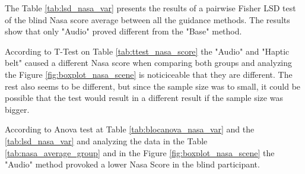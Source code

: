 

The Table \ref{tab:lsd_nasa_var} presents the results of a pairwise Fisher LSD test of the blind Nasa score average between all the guidance methods. The results show that only "Audio" proved different from the "Base" method.



According to T-Test on Table \ref{tab:ttest_nasa_score} the "Audio" and "Haptic belt" caused a different Nasa score when comparing both groups and analyzing the Figure \ref{fig:boxplot_nasa_scene} is noticiceable that they are different. The rest also seems to be different, but since the sample size was to small, it could be possible that the test would result in a different result if the sample size was bigger.

According to Anova test at Table \ref{tab:blocanova_nasa_var} and the \ref{tab:lsd_nasa_var} and analyzing the data in the Table \ref{tab:nasa_average_group} and in the Figure \ref{fig:boxplot_nasa_scene} the "Audio" method provoked a lower Nasa Score in the blind participant.

\FloatBarrier